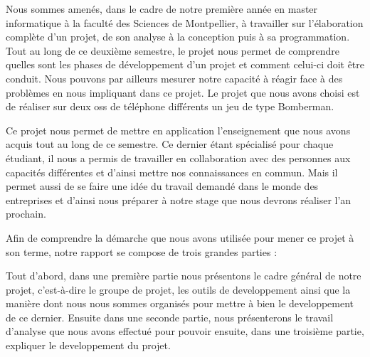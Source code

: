 Nous sommes amenés, dans le cadre de notre première année en master informatique à la faculté des Sciences de Montpellier, à travailler sur l’élaboration complète d’un projet, de son analyse à la conception puis à sa programmation. Tout au long de ce deuxième semestre, le projet nous permet de comprendre quelles sont les phases de développement d’un projet et comment celui-ci doit être conduit. Nous pouvons par ailleurs mesurer notre capacité à réagir face à des problèmes en nous impliquant dans ce projet. Le projet que nous avons choisi est de réaliser sur deux \glspl{os} de téléphone différents un jeu de type Bomberman.

Ce projet nous permet de mettre en application l'enseignement que nous avons acquis tout au long de ce semestre. Ce dernier étant spécialisé pour chaque étudiant, il nous a permis de travailler en collaboration avec des personnes aux capacités différentes et d'ainsi mettre nos connaissances en commun. Mais il permet aussi de se faire une idée du travail demandé dans le monde des entreprises et d'ainsi nous préparer à notre stage que nous devrons réaliser l'an prochain.

Afin de comprendre la démarche que nous avons utilisée pour mener ce projet à son terme, notre rapport se compose de trois grandes parties : 

Tout d'abord, dans une première partie nous présentons le cadre général de notre projet, c'est-à-dire le groupe de projet, les outils de developpement ainsi que la manière dont nous nous sommes organisés pour mettre à bien le developpement de ce dernier. Ensuite dans une seconde partie, nous présenterons le travail d'analyse que nous avons effectué pour pouvoir ensuite, dans une troisième partie, expliquer le developpement du projet.
